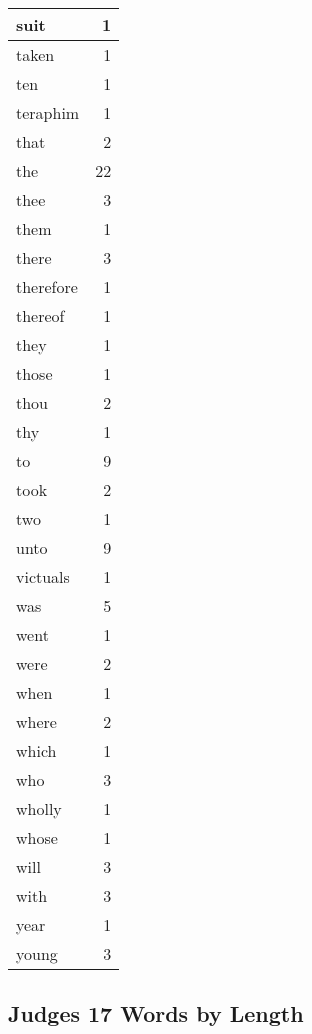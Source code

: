 \begin{center}
\begin{longtable}{l|r}
suit & 1\\ \hline 
taken & 1\\ \hline 
ten & 1\\ \hline 
teraphim & 1\\ \hline 
that & 2\\ \hline 
the & 22\\ \hline 
thee & 3\\ \hline 
them & 1\\ \hline 
there & 3\\ \hline 
therefore & 1\\ \hline 
thereof & 1\\ \hline 
they & 1\\ \hline 
those & 1\\ \hline 
thou & 2\\ \hline 
thy & 1\\ \hline 
to & 9\\ \hline 
took & 2\\ \hline 
two & 1\\ \hline 
unto & 9\\ \hline 
victuals & 1\\ \hline 
was & 5\\ \hline 
went & 1\\ \hline 
were & 2\\ \hline 
when & 1\\ \hline 
where & 2\\ \hline 
which & 1\\ \hline 
who & 3\\ \hline 
wholly & 1\\ \hline 
whose & 1\\ \hline 
will & 3\\ \hline 
with & 3\\ \hline 
year & 1\\ \hline 
young & 3\\ \hline 
\end{longtable}
\end{center}





\subsection{Judges 17 Words by Length}


\normalsize
 
